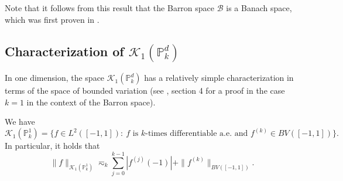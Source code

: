 Note that it follows from this result that the Barron space $\mathcal{B}$ is a Banach space, which was first proven in \cite{wojtowytsch2020representation}.

\subsection{Characterization of $\mathcal{K}_1(\mathbb{P}^d_k)$}
In one dimension, the space $\mathcal{K}_1(\mathbb{P}^d_k)$ has a relatively simple characterization in terms of the space of bounded variation (see \cite{wojtowytsch2020representation}, section 4 for a proof in the case $k=1$ in the context of the Barron space).

\begin{theorem}\label{barron-space-1-d-characterization-theorem}
 We have
 \begin{equation}
 \mathcal{K}_1(\mathbb{P}^1_k) = \{f\in L^2([-1,1]):~\text{$f$ is $k$-times differentiable a.e. and }f^{(k)}\in BV([-1,1])\}.
 \end{equation}
 In particular, it holds that
 \begin{equation}
  \|f\|_{\mathcal{K}_1(\mathbb{P}^1_k)} \eqsim_k \sum_{j=0}^{k-1} |f^{(j)}(-1)| + \|f^{(k)}\|_{BV([-1,1])}. 
 \end{equation}

\end{theorem}
